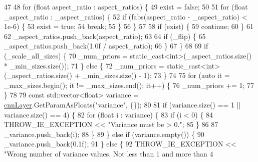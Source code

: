 \begin{DoxyCode}
47 
48             \textcolor{keywordflow}{for} (\textcolor{keywordtype}{float} aspect\_ratio : aspect\_ratios) \{
49                 exist = \textcolor{keyword}{false};
50 
51                 \textcolor{keywordflow}{for} (\textcolor{keywordtype}{float} \_aspect\_ratio : \_aspect\_ratios) \{
52                     \textcolor{keywordflow}{if} (fabs(aspect\_ratio - \_aspect\_ratio) < 1e-6) \{
53                         exist = \textcolor{keyword}{true};
54                         \textcolor{keywordflow}{break};
55                     \}
56                 \}
57 
58                 \textcolor{keywordflow}{if} (exist) \{
59                     \textcolor{keywordflow}{continue};
60                 \}
61 
62                 \_aspect\_ratios.push\_back(aspect\_ratio);
63 
64                 \textcolor{keywordflow}{if} (\_flip) \{
65                     \_aspect\_ratios.push\_back(1.0f / aspect\_ratio);
66                 \}
67             \}
68 
69             \textcolor{keywordflow}{if} (\_scale\_all\_sizes) \{
70                 \_num\_priors = \textcolor{keyword}{static\_cast<}\textcolor{keywordtype}{int}\textcolor{keyword}{>}(\_aspect\_ratios.size() * \_min\_sizes.size());
71             \} \textcolor{keywordflow}{else} \{
72                 \_num\_priors = \textcolor{keyword}{static\_cast<}\textcolor{keywordtype}{int}\textcolor{keyword}{>}(\_aspect\_ratios.size() + \_min\_sizes.size() - 1);
73             \}
74 
75             \textcolor{keywordflow}{for} (\textcolor{keyword}{auto} it = \_max\_sizes.begin(); it != \_max\_sizes.end(); it++) \{
76                 \_num\_priors += 1;
77             \}
78 
79             \textcolor{keyword}{const} std::vector<float> variance = \hyperlink{classInferenceEngine_1_1Extensions_1_1Cpu_1_1ExtLayerBase_a1074cdccacb9e9ca6eec01bbc2f7ca4a}{cnnLayer}.GetParamAsFloats(\textcolor{stringliteral}{"variance"}, \{\});
80 
81             \textcolor{keywordflow}{if} (variance.size() == 1 || variance.size() == 4) \{
82                 \textcolor{keywordflow}{for} (\textcolor{keywordtype}{float} i : variance) \{
83                     \textcolor{keywordflow}{if} (i < 0) \{
84                         THROW\_IE\_EXCEPTION << \textcolor{stringliteral}{"Variance must be > 0."};
85                     \}
86 
87                     \_variance.push\_back(i);
88                 \}
89             \} \textcolor{keywordflow}{else} \textcolor{keywordflow}{if} (variance.empty()) \{
90                 \_variance.push\_back(0.1f);
91             \} \textcolor{keywordflow}{else} \{
92                 THROW\_IE\_EXCEPTION << \textcolor{stringliteral}{"Wrong number of variance values. Not less than 1 and more than 4
}
\end{DoxyCode}
